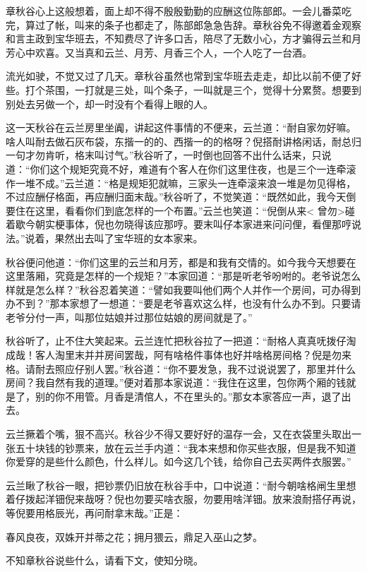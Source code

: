\documentclass[12pt,UTF8]{ctexbook}
\begin{document}
{{{章秋谷心上这般想着，面上却不得不殷殷勤勤的应酬这位陈部郎。一会儿番菜吃完，算过了帐，叫来的条子也都走了，陈部郎急急告辞。章秋谷免不得邀着金观察和言主政到宝华班去，不知费尽了许多口舌，陪尽了无数小心，方才骗得云兰和月芳心中欢喜。又当真和云兰、月芳、月香三个人，一个人吃了一台酒。

流光如驶，不觉又过了几天。章秋谷虽然也常到宝华班去走走，却比以前不便了好些。打个茶围，一打就是三处，叫个条子，一叫就是三个，觉得十分累赘。想要到别处去另做一个，却一时没有个看得上眼的人。

这一天秋谷在云兰房里坐阗，讲起这件事情的不便来，云兰道：“耐自家勿好嘛。啥人叫耐去做石灰布袋，东揩一的的、西揩一的的格呀？倪搭耐讲格闲话，耐总归一句才勿肯听，格末叫讨气。”秋谷听了，一时倒也回答不出什么话来，只说道：“你们这个规矩究竟不好，难道有个客人在你们这里住夜，也是三个一连牵滚作一堆不成。”云兰道：“格是规矩犯就嘛，三家头一连牵滚来浪一堆是勿见得格，不过应酬仔格面，再应酬归面末哉。”秋谷听了，不觉笑道：“既然如此，我今天倒要住在这里，看看你们到底怎样的一个布置。”云兰也笑道：“倪倒从来< 曾勿>碰着歇今朝实梗事体，倪也勿晓得该应那哼。要末叫仔本家进来问问俚，看俚那哼说法。”说着，果然出去叫了宝华班的女本家来。

秋谷便问他道：“你们这里的云兰和月芳，都是和我有交情的。如今我今天想要在这里落厢，究竟是怎样的一个规矩？”本家回道：“那是听老爷吩咐的。老爷说怎么样就是怎么样？”秋谷忍着笑道：“譬如我要叫他们两个人并作一个房间，可办得到办不到？”那本家想了一想道：“要是老爷喜欢这么样，也没有什么办不到。只要请老爷分付一声，叫那位姑娘并过那位姑娘的房间就是了。”

秋谷听了，止不住大笑起来。云兰连忙把秋谷拉了一把道：“耐格人真真呒拨仔淘成哉！客人淘里末并并房间罢哉，阿有啥格件事体也好并啥格房间格？倪是勿来格。请耐去照应仔别人罢。”秋谷道：“你不要发急，我不过说说罢了，那里并什么房间？我自然有我的道理。”便对着那本家说道：“我住在这里，包你两个厢的钱就是了，别的你不用管。月香是清倌人，不在里头的。”那女本家答应一声，退了出去。

云兰撅着个嘴，狠不高兴。秋谷少不得又要好好的温存一会，又在衣袋里头取出一张五十块钱的钞票来，放在云兰手内道：“我本来想和你买些衣服，但是我不知道你爱穿的是些什么颜色，什么样儿。如今这几个钱，给你自己去买两件衣服罢。”

云兰瞅了秋谷一眼，把钞票仍旧放在秋谷手中，口中说道：“耐今朝啥格闸生里想着仔拨起洋钿倪来哉呀？倪也勿要买啥衣服，勿要用啥洋钿。放来浪耐搭仔再说，等倪要用格辰光，再问耐拿末哉。”正是：

春风良夜，双姝开并蒂之花；拥月猥云，鼎足入巫山之梦。

不知章秋谷说些什么，请看下文，使知分晓。





}}}
\end{document}
